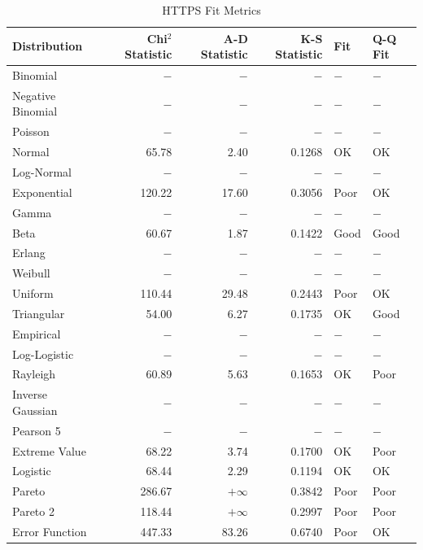 \documentclass{article}
\begin{document}
\begin{table}[htbp]
\centering
\begin{tabular}{ l r r r l l }

\toprule
Distribution & Chi$^2$ Statistic & A-D Statistic & K-S Statistic & Fit & Q-Q Fit \\
\midrule

Binomial          &    $-$ &      $-$  &    $-$ & $-$  & $-$  \\
Negative Binomial &    $-$ &      $-$  &    $-$ & $-$  & $-$  \\
Poisson           &    $-$ &      $-$  &    $-$ & $-$  & $-$  \\
Normal            &  65.78 &     2.40  & 0.1268 & OK   & OK   \\
Log-Normal        &    $-$ &      $-$  &    $-$ & $-$  & $-$  \\
Exponential       & 120.22 &    17.60  & 0.3056 & Poor & OK   \\
Gamma             &    $-$ &      $-$  &    $-$ & $-$  & $-$  \\
Beta              &  60.67 &     1.87  & 0.1422 & Good & Good \\
Erlang            &    $-$ &      $-$  &    $-$ & $-$  & $-$  \\
Weibull           &    $-$ &      $-$  &    $-$ & $-$  & $-$  \\
Uniform           & 110.44 &    29.48  & 0.2443 & Poor & OK   \\
Triangular        &  54.00 &     6.27  & 0.1735 & OK   & Good \\
Empirical         &    $-$ &      $-$  &    $-$ & $-$  & $-$  \\
Log-Logistic      &    $-$ &      $-$  &    $-$ & $-$  & $-$  \\
Rayleigh          &  60.89 &     5.63  & 0.1653 & OK   & Poor \\
Inverse Gaussian  &    $-$ &      $-$  &    $-$ & $-$  & $-$  \\
Pearson 5         &    $-$ &      $-$  &    $-$ & $-$  & $-$  \\
Extreme Value     &  68.22 &     3.74  & 0.1700 & OK   & Poor \\
Logistic          &  68.44 &     2.29  & 0.1194 & OK   & OK   \\
Pareto            & 286.67 & $+\infty$ & 0.3842 & Poor & Poor \\
Pareto 2          & 118.44 & $+\infty$ & 0.2997 & Poor & Poor \\
Error Function    & 447.33 &    83.26  & 0.6740 & Poor & OK   \\
\bottomrule

\end{tabular}
\caption{HTTPS Fit Metrics}
\label{https_fit}
\end{table}
\end{document}
